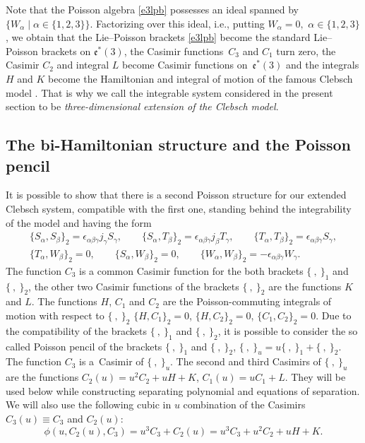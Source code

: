 \documentclass[pdftex]{sigma}
\def\a{\alpha}
\def\b{\beta}
\def\g{\gamma}
\def\e{\epsilon}
\numberwithin{equation}{section}
\begin{document}
\begin{Remark}
 Note that the Poisson algebra \eqref{e3lpb} possesses an ideal spanned by $\{W_{\a}\mid \a\in \{1,2,3\} \}$. Factorizing over this ideal, i.e., putting $W_{\a}=0,$ $\a\in \{1,2,3\}$, we obtain that the Lie--Poisson brackets \eqref{e3lpb} become the standard Lie--Poisson brackets on $\mathfrak{e}^*(3)$, the Casimir functions~$C_3$ and $C_1$ turn zero, the Casimir $C_2$ and integral $L$ become Casimir functions on~$\mathfrak{e}^*(3)$ and the integrals $H$ and $K$ become the Hamiltonian and integral of motion of the famous Clebsch model \cite{Clebsch}. That is why we call the integrable system considered in the present section to be {\it three-dimensional extension of the Clebsch model}.
\end{Remark}

\subsection{The bi-Hamiltonian structure and the Poisson pencil}
It is possible to show that there is a second Poisson structure
for our extended Clebsch system, compatible with the first one, standing behind the integrability of the model and having
the form
 \begin{subequations}\label{so4lpb}
\begin{gather}
\{ S_{\a}, S_{\b}\}_2=\e_{\a\b\g} j_{\g} S_{\g}, \qquad \{ S_{\a},
T_{\b}\}_2=\e_{\a\b\g} j_{\b} T_{\g},\qquad \{ T_{\a}, T_{\b}\}_2= \e_{\a\b\g} S_{\g},\label{e4lpb1}
\\
\{ T_{\a}, W_{\b}\}_2=0, \qquad \{ S_{\a},
W_{\b}\}_2=0,\qquad \{ W_{\a}, W_{\b}\}_2= - \e_{\a\b\g} W_{\g}.\label{so4lpb2}
\end{gather}
\end{subequations}
The function $C_3$ is a common Casimir function
for the both brackets $\{\ , \ \}_1$ and $\{\ , \ \}_2$, the other two Casimir functions of the brackets $\{\ , \ \}_2$ are the functions $K$ and $L$. The functions $H$, $C_1$ and $C_2$ are the Poisson-commuting integrals of motion with respect to $\{\ , \ \}_2$
$\{H,C_1\}_2=0$, $ \{H,C_2\}_2=0$, $ \{C_1,C_2\}_2=0$.
Due to the compatibility of the brackets $\{\ , \ \}_1$ and $\{\ , \ \}_2$, it is possible to consider the so called Poisson pencil of the brackets $\{\ , \ \}_1$ and $\{\ , \ \}_2$,
$
\{\ , \ \}_u= u\{\ , \ \}_1+ \{\ , \ \}_2$.
The function $C_3$ is a~Casimir
of $\{\ , \ \}_u$. The second and third Casimirs of $\{\ , \ \}_u$ are the functions
$
C_2(u)= u^{2}C_2+u H+K$,
$
C_1(u)= u C_1+L$.
They will be used below while constructing separating polynomial and equations of separation. We will also use the following cubic in $u$ combination of the Casimirs $C_3(u)\equiv C_3$ and $C_2(u)$:
\[
\phi(u,C_2(u),C_3)= u^3 C_3 +C_2(u)=u^3 C_3+ u^{2}C_2+u H+K.
\]
\end{document}
